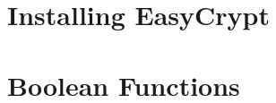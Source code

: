 \documentclass[12pt,openany]{book}
\begin{document}
	
	
	\tableofcontents
	\newpage
	
	\newpage
	\chapter{Installing EasyCrypt}
	
		
	\newpage
	\appendix
	\chapter{Boolean Functions}
%	
	
	
		
\end{document}
